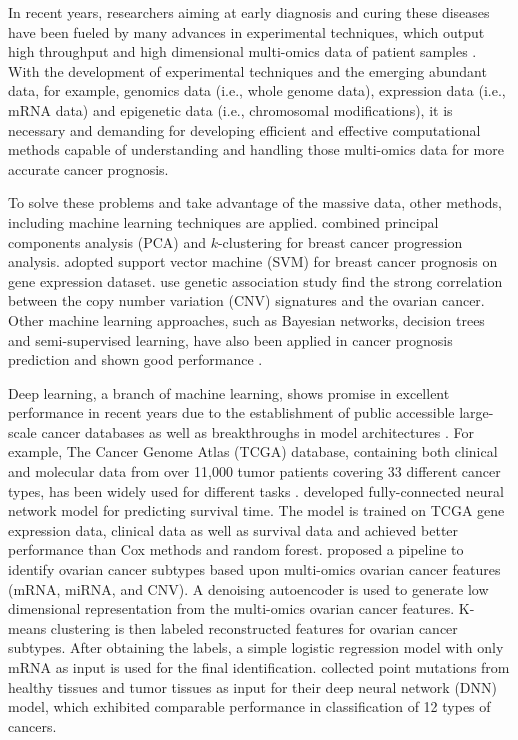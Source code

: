 \documentclass{article}
\begin{document}
In recent years, researchers aiming at early diagnosis and curing these diseases have been fueled by many advances in experimental techniques, which output high throughput and high dimensional multi-omics data of patient samples \citep{wooster2003breast,goossens2015cancer}. With the development of experimental techniques and the emerging abundant data, for example, genomics data (i.e., whole genome data), expression data (i.e., mRNA data) and epigenetic data (i.e., chromosomal modifications), it is necessary and demanding for developing efficient and effective computational methods capable of understanding and handling those multi-omics data for more accurate cancer prognosis\citep{zhu2020application}.


To solve these problems and take advantage of the massive data, other methods, including machine learning techniques are applied. \citet{alexe2007analysis} combined principal components analysis (PCA) and $k$-clustering for breast cancer progression analysis. \citet{xu2012gene} adopted support vector machine (SVM) for breast cancer prognosis on gene expression dataset. \citet{graf2021association} use genetic association study find the strong correlation between the copy number variation (CNV) signatures and the ovarian cancer. Other machine learning approaches, such as Bayesian networks, decision trees and semi-supervised learning, have also been applied in cancer prognosis prediction and shown good performance \citep{kourou2015machine}.

Deep learning, a branch of machine learning, shows promise in excellent performance in recent years due to the establishment of public accessible large-scale cancer databases as well as breakthroughs in model architectures \citep{zhu2020application}. For example, The Cancer Genome Atlas (TCGA) database, containing both clinical and molecular data from over 11,000 tumor patients covering 33 different cancer types, has been widely used for different tasks \citep{tomczak2015cancer}. \citet{ching2018cox} developed fully-connected neural network model for predicting survival time. The model is trained on TCGA gene expression data, clinical data as well as survival data and achieved better performance than Cox methods and random forest. \citet{guo2020deep} proposed a pipeline to identify ovarian cancer subtypes based upon multi-omics ovarian cancer features (mRNA, miRNA, and CNV). A denoising autoencoder is used to generate low dimensional representation from the multi-omics ovarian cancer features. K-means clustering is then labeled reconstructed features for ovarian cancer subtypes. After obtaining the labels, a simple logistic regression model with only mRNA as input is used for the final identification. \citet{sun2019identification} collected point mutations from healthy tissues and tumor tissues as input for their deep neural network (DNN) model, which exhibited comparable performance in classification of 12 types of cancers.
\end{document}
